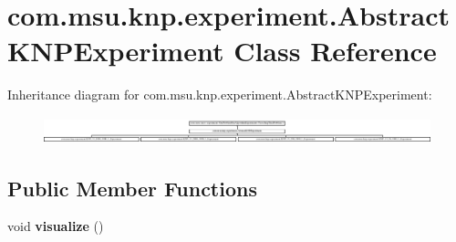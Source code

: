 \hypertarget{classcom_1_1msu_1_1knp_1_1experiment_1_1AbstractKNPExperiment}{\section{com.\-msu.\-knp.\-experiment.\-Abstract\-K\-N\-P\-Experiment Class Reference}
\label{classcom_1_1msu_1_1knp_1_1experiment_1_1AbstractKNPExperiment}
}
Inheritance diagram for com.\-msu.\-knp.\-experiment.\-Abstract\-K\-N\-P\-Experiment\-:\begin{figure}[H]
\begin{center}
\leavevmode
\includegraphics[height=0.783582cm]{classcom_1_1msu_1_1knp_1_1experiment_1_1AbstractKNPExperiment}
\end{center}
\end{figure}
\subsection*{Public Member Functions}
\begin{DoxyCompactItemize}
\item 
\hypertarget{classcom_1_1msu_1_1knp_1_1experiment_1_1AbstractKNPExperiment_a66c8de1695336bb9ab4a7939d5b170a8}{void {\bfseries visualize} ()}\label{classcom_1_1msu_1_1knp_1_1experiment_1_1AbstractKNPExperiment_a66c8de1695336bb9ab4a7939d5b170a8}

\end{DoxyCompactItemize}
